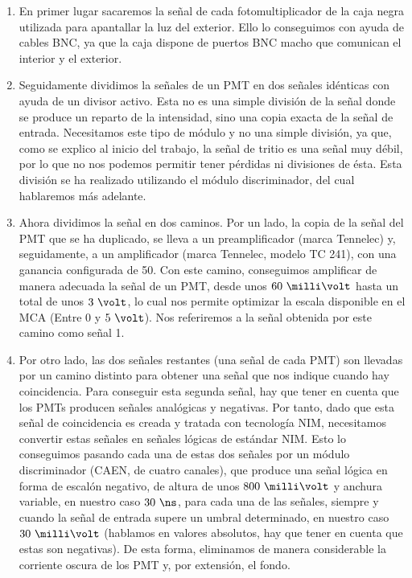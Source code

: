 \begin{enumerate} 
\item{} En primer lugar sacaremos la señal de cada fotomultiplicador de la caja negra utilizada para apantallar la luz del exterior. Ello lo conseguimos con ayuda de cables BNC,  ya que la caja dispone de puertos BNC macho que comunican el interior y el exterior.

\item {} Seguidamente dividimos la señales de un PMT en dos señales idénticas con ayuda de un divisor activo. Esta no es una simple división de la señal donde se produce un reparto de la intensidad, sino una copia exacta de la señal de entrada. Necesitamos este tipo de módulo y no una simple división, ya que, como se explico al inicio del trabajo, la señal de tritio es una señal muy débil, por lo que no nos podemos permitir tener pérdidas ni divisiones de ésta. Esta división se ha realizado utilizando el módulo discriminador, del cual hablaremos más adelante.

\item {} Ahora dividimos la señal en dos caminos. Por un lado, la copia de la señal del PMT que se ha duplicado, se lleva a un preamplificador (marca Tennelec) y, seguidamente, a un amplificador (marca Tennelec, modelo TC 241), con una ganancia configurada de 50. Con este camino, conseguimos amplificar de manera adecuada la señal de un PMT, desde unos  $60~\milli\volt$ hasta un total de unos $3~\volt$, lo cual nos permite optimizar la escala disponible en el MCA (Entre 0 y $5~\volt$). Nos referiremos a la señal obtenida por este camino como señal 1.

\item{} Por otro lado, las dos señales restantes (una señal de cada PMT) son  llevadas por un camino distinto para obtener una señal que nos indique cuando hay coincidencia. Para conseguir esta segunda señal, hay que tener en cuenta que los PMTs producen señales analógicas y negativas. Por tanto, dado que esta señal de coincidencia es creada y tratada con tecnología NIM, necesitamos convertir estas señales en señales lógicas de estándar NIM. 
Esto lo conseguimos pasando cada una de estas dos señales por un módulo discriminador (CAEN, de cuatro canales), que produce una señal lógica en forma de escalón negativo, de altura de unos $800~\milli\volt$ y anchura variable, en nuestro caso $30~\ns$, para cada una de las señales, siempre y cuando la señal de entrada supere un umbral determinado, en nuestro caso $30~\milli\volt$ (hablamos en valores absolutos, hay que tener en cuenta que estas son negativas). De esta forma, eliminamos de manera considerable la corriente oscura de los PMT y, por extensión, el fondo.


\end{enumerate}
